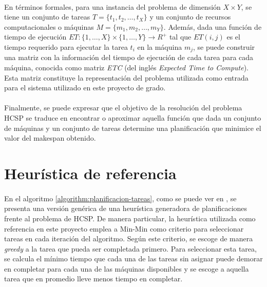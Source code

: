 \paragraph{}En términos formales, para una instancia del problema de dimensión $X\times Y$, se tiene un conjunto de tareas $T = \{t_1,t_2,\dots,t_X\}$ y un conjunto de recursos computacionales o máquinas $M = \{m_1,m_2,\dots,m_Y \}$. Además, dada una función de tiempo de ejecución $ET : \{1,\dots,X\} \times \{1,\dots,Y\} \rightarrow R^+$ tal que $ET(i,j)$ es el tiempo requerido para ejecutar la tarea $t_i$ en la máquina $m_j$, se puede construir una matriz con la información del tiempo de ejecución de cada tarea para cada máquina, conocida como matriz \textit{ETC} (del inglés \textit{Expected Time to Compute}). Esta matriz constituye la representación del problema utilizada como entrada para el sistema utilizado en este proyecto de grado.

\paragraph{}Finalmente, se puede expresar que el objetivo de la resolución del problema HCSP se traduce en encontrar o aproximar aquella función que dada un conjunto de máquinas y un conjunto de tareas determine una planificación que minimice el valor del makespan obtenido.


 \section{Heurística de referencia} \label{section:descripcion-problema,subsection:heuristica}
 
\paragraph{}En el algoritmo \ref{algorithm:planificacion-tareas}, como se puede ver en \citet{bib-doctorado-nesmachnow}, se presenta una versión genérica de una heurística generadora de planificaciones frente al problema de HCSP. De manera particular, la heurística utilizada como referencia en este proyecto emplea a Min-Min como criterio para seleccionar tareas en cada iteración del algoritmo. Según este criterio, se escoge de manera \textit{greedy} a la tarea que pueda ser completada primero. Para seleccionar esta tarea, se calcula el mínimo tiempo que cada una de las tareas sin asignar puede demorar en completar para cada una de las máquinas disponibles y se escoge a aquella tarea que en promedio lleve menos tiempo en completar.

